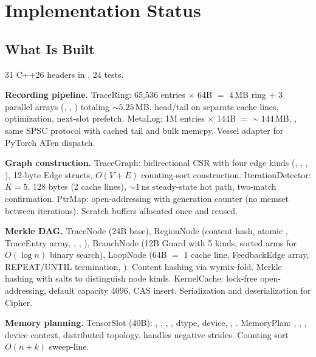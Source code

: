 
\section{Implementation Status}\label{sec:implementation}

\subsection{What Is Built}

31 C++26 headers in , 24 tests.

\textbf{Recording pipeline.}
TraceRing: 65,536 entries $\times$ 64B $=$ 4\,MB ring + 3 parallel arrays (, , ) totaling ${\sim}5.25$\,MB.
 head/tail on separate cache lines,  optimization, next-slot prefetch.
MetaLog: 1M entries $\times$ 144B $= {\sim}144$\,MB, , same SPSC protocol with cached tail and bulk memcpy.
Vessel adapter for PyTorch ATen dispatch.

\textbf{Graph construction.}
TraceGraph: bidirectional CSR with four edge kinds (, , , ), 12-byte Edge structs, $O(V{+}E)$ counting-sort construction.
IterationDetector: $K{=}5$, 128 bytes (2 cache lines), ${\sim}1$\,ns steady-state hot path, two-match confirmation.
PtrMap: open-addressing with generation counter (no memset between iterations).
Scratch buffers allocated once and reused.

\textbf{Merkle DAG.}
TraceNode (24B base), RegionNode (content hash, atomic , TraceEntry array, , , ), BranchNode (12B Guard with 5 kinds, sorted arms for $O(\log n)$ binary search), LoopNode (64B $=$ 1 cache line, FeedbackEdge array, REPEAT/UNTIL termination, ).
Content hashing via wymix-fold.
Merkle hashing with salts to distinguish node kinds.
KernelCache: lock-free open-addressing, default capacity 4096, CAS insert.
Serialization and deserialization for Cipher.

\textbf{Memory planning.}
TensorSlot (40B): , , , , dtype, device, , .
MemoryPlan: , , , device context, distributed topology.
 handles negative strides.
Counting sort $O(n{+}k)$ sweep-line.

